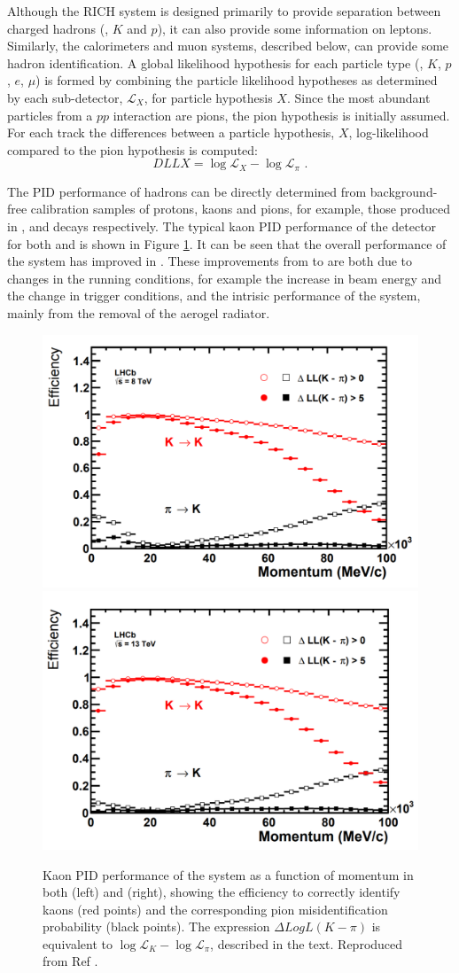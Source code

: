 Although the RICH system is designed primarily to provide separation between charged hadrons (\pion, $K$ and $p$), it can also provide some information on leptons. Similarly, the calorimeters and muon systems, described below, can provide some hadron identification. A global likelihood hypothesis for each particle type (\pion, $K$, $p$, $e$, $\mu$) is formed by combining the particle likelihood hypotheses as determined by each sub-detector, $\mathcal{L}_X$, for particle hypothesis $X$. Since the most abundant particles from a $pp$ interaction are pions, the pion hypothesis is initially assumed. For each track the differences between a particle hypothesis, $X$, log-likelihood compared to the pion hypothesis is computed:
\begin{equation}
DLLX = \log{\mathcal{L}_X} - \log{\mathcal{L}_{\pi}} \text{ .}
\end{equation}

The PID performance of hadrons can be directly determined from background-free calibration samples of protons, kaons and pions, for example, those produced in \Lz, \Dstarm and \KS decays respectively. The typical kaon PID performance of the \lhcb detector for both \runone and \runtwo is shown in Figure \ref{richperformance}. It can be seen that the overall performance of the \rich system has improved in \runtwo. These improvements from \runone to \runtwo are both due to changes in the running conditions, for example the increase in beam energy and the change in trigger conditions, and the intrisic performance of the \rich system, mainly from the removal of the aerogel radiator.

\begin{figure}
\includegraphics[width=0.5\linewidth]{figures/detector/richperformance_run1.pdf}
\includegraphics[width=0.5\linewidth]{figures/detector/richperformance_run2.pdf}
\caption{Kaon PID performance of the \rich system as a function of momentum in both \runone (left) and \runtwo (right), showing the efficiency to correctly identify kaons (red points) and the corresponding pion misidentification probability (black points). The expression $\Delta LogL(K - \pi)$ is equivalent to $\log{\mathcal{L}_K} - \log{\mathcal{L}_{\pi}}$, described in the text. Reproduced from Ref \cite{richrun2}.}
\label{richperformance}
\end{figure}

